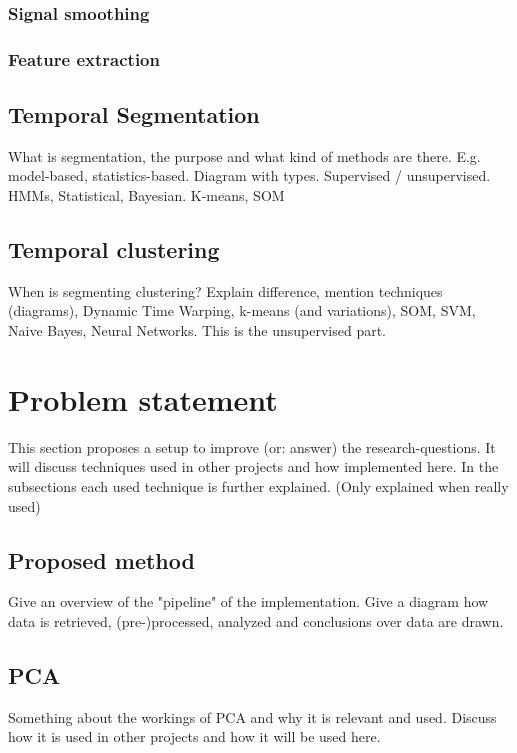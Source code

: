 \documentclass[a4paper,10pt]{extarticle}
\begin{document}
    \subsubsection{Signal smoothing}

    \subsubsection{Feature extraction}

	\subsection{Temporal Segmentation}
  What is segmentation, the purpose and what kind of methods are there. E.g. model-based, statistics-based. Diagram with types. Supervised / unsupervised. HMMs, Statistical, Bayesian. K-means, SOM

  \subsection{Temporal clustering}
  When is segmenting clustering? Explain difference, mention techniques (diagrams), Dynamic Time Warping, k-means (and variations), SOM, SVM, Naive Bayes, Neural Networks. This is the unsupervised part.




\section{Problem statement}
This section proposes a setup to improve (or: answer) the research-questions. It will discuss techniques used in other projects and how implemented here. In the subsections each used technique is further explained. (Only explained when really used)

  \subsection{Proposed method}
  Give an overview of the "pipeline" of the implementation. Give a diagram how data is retrieved, (pre-)processed, analyzed and conclusions over data are drawn.

  \subsection{PCA}
  Something about the workings of PCA and why it is relevant and used. Discuss how it is used in other projects and how it will be used here.
\end{document}
